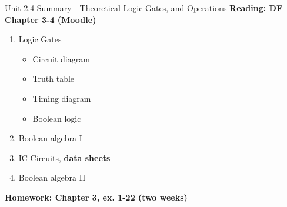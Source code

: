 \documentclass{beamer}
\begin{document}
\begin{frame}{Unit 2.4 Summary - Theoretical Logic Gates, and Operations}
\textbf{Reading: DF Chapter 3-4 (Moodle)}
\begin{enumerate}
\item Logic Gates
\begin{itemize}
\item Circuit diagram
\item Truth table
\item Timing diagram
\item Boolean logic
\end{itemize}
\item \alert{Boolean algebra I}
\item IC Circuits, \textbf{data sheets}
\item \alert{Boolean algebra II}
\end{enumerate}
\textbf{Homework: Chapter 3, ex. 1-22 (two weeks)}
\end{frame}
\end{document}
